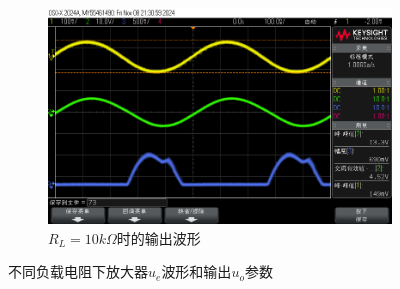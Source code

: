 \documentclass[UTF8]{ctexart}
\begin{document}
\begin{figure}[H]
    \begin{subfigure}[c]{0.5\textwidth}
        \centering
        \includegraphics[width=\textwidth]{pics/73.png}
        \caption{$R_L=10k\Omega$时的输出波形}\label{fig:73}
    \end{subfigure}
    \caption{不同负载电阻下放大器$u_e$波形和输出$u_o$参数}\label{fig:6}
\end{figure}
\end{document}
